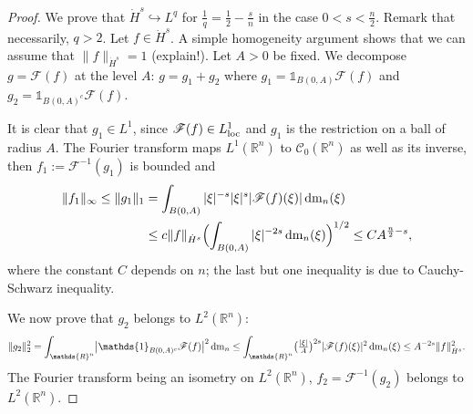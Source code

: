 \documentclass[a4paper, 12pt]{article}
\theoremstyle{plain}
\theoremstyle{definition}
\theoremstyle{remark}
\numberwithin{equation}{section}
\begin{document}
\begin{proof}
We prove that $\dot H^s\hookrightarrow L^q$ for $\frac{1}{q}=\frac{1}{2}-\frac{s}{n}$ in the case $0<s<\frac{n}{2}$.
Remark that necessarily, $q>2$. Let $f\in \dot H^s$. A simple homogeneity argument shows that we can
assume that $\|f\|_{\dot H^s}=1$ (explain!).
Let $A>0$ be fixed. We decompose $g={\mathscr{F}}(f)$ at the level $A$: $g=g_1+g_2$ where $g_1= {\mathds{1}}_{B(0,A)}{\mathscr{F}}(f)$ and 
$g_2= {\mathds{1}}_{B(0,A)^c}{\mathscr{F}}(f)$. 

It is clear that $g_1\in L^1$, since ${\mathscr{F}}(f)\in L^1_{\rm loc}$ and $g_1$ is the restriction on a ball of radius $A$.
The Fourier transform maps $L^1({\mathds{R}}^n)$ to ${\mathscr{C}}_0({\mathds{R}}^n)$ as well as its inverse, 
then $f_1:={\mathscr{F}}^{-1}(g_1)$ is bounded and
%
\begin{align*}
\|f_1\|_\infty\le \|g_1\|_1&= \int_{B(0,A)}|\xi|^{-s}|\xi|^s|{\mathscr{F}}(f)(\xi)|\,{\rm dm}_n(\xi)\\
&\le c \|f\|_{\dot H^s}\Bigl(\int_{B(0,A)}|\xi|^{-2s}\,{\rm dm}_n(\xi)\Bigr)^{1/2}
\le C A^{\frac{n}{2}-s},
\end{align*}
%
where the constant $C$ depends on $n$; the last but one inequality is due to Cauchy-Schwarz inequality. 

We now prove that $g_2$ belongs to $L^2({\mathds{R}}^n)$:
\[
\|g_2\|_2^2=\int_{{\mathds{R}}^n}\bigl|{\mathds{1}}_{B(0,A)^c}{\mathscr{F}}(f)\bigr|^2\,{\rm dm}_n
\le \int_{{\mathds{R}}^n} \bigl(\tfrac{|\xi|}{A}\bigr)^{2s}|{\mathscr{F}}(f)(\xi)|^2\,{\rm dm}_n(\xi)\le A^{-2s}\|f\|_{\dot H^s}^2.
\]
The Fourier transform being an isometry on $L^2({\mathds{R}}^n)$, $f_2={\mathscr{F}}^{-1}(g_2)$ belongs to $L^2({\mathds{R}}^n)$.


\end{proof}
\end{document}
